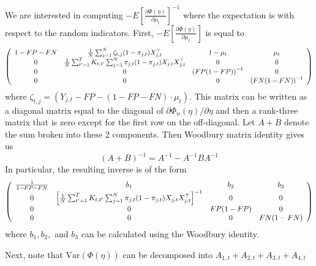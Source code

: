 \documentclass[11pt]{amsart}
\numberwithin{equation}{section}
\theoremstyle{plain}
\begin{document}
We are interested in computing $- E \left[ \frac{\partial \Phi (\eta)}{\partial \mu_t} \right]^{-1}$ where the expectation is with respect to the random indicators. First, $- E \left[ \frac{\partial \Phi (\eta)}{\partial \mu_t} \right]$ is equal to
$$
\left (
\begin{array}{c c c c}
1-FP-FN & \frac{1}{N} \sum_{j=1}^N \zeta_{t,j} (1-\pi_{j,t}) X_{j,t}^\top & 1 - \mu_t & \mu_t \\
0 & \frac{1}{N} \sum_{t^\prime=1}^T K_{t,t^\prime} \sum_{j=1}^N \pi_{j,t} (1-\pi_{j,t}) X_{j,t} X_{j,t}^\top & 0 & 0\\
0 & 0 & \left( FP (1-FP) \right)^{-1}  & 0\\
0 & 0 & 0 & \left( FN (1-FN) \right)^{-1}
\end{array}
\right )
$$
where $\zeta_{t,j} = (Y_{j,t} - FP - (1-FP-FN) \cdot \mu_t)$. This matrix can be written as a diagonal matrix equal to the diagonal of $\partial \Phi_n (\eta)/\partial \eta$ and then a rank-three matrix that is zero except for the first row on the off-diagonal. Let $A + B$ denote the sum broken into these 2 components.  Then Woodbury matrix identity gives us
$$
(A+B)^{-1} = A^{-1} - A^{-1} B A^{-1}
$$
In particular, the resulting inverse is of the form
$$
\left (
\begin{array}{c c c c}
\frac{1}{1-FP-FN} & b_1 & b_2  & b_3 \\
0 & \left[\frac{1}{N} \sum_{t^\prime=1}^T K_{t,t^\prime} \sum_{j=1}^N \pi_{j,t} (1-\pi_{j,t}) X_{j,t} X_{j,t}^\top\right]^{-1} & 0 & 0\\
0 & 0 & FP (1-FP)   & 0\\
0 & 0 & 0 & FN (1-FN)
\end{array}
\right)
$$
where $b_1, b_2,$ and $b_3$ can be calculated using the Woodbury identity.

Next, note that $\text{Var}(\Phi(\eta))$ can be decomposed into $A_{1,t} + A_{2,t} + A_{3,t} + A_{4,t}$
\end{document}
